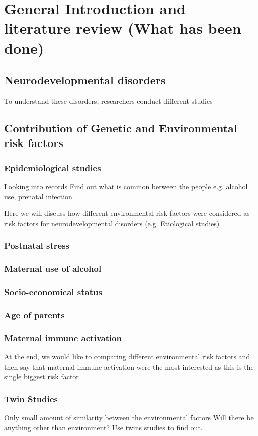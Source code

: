 \chapter{General Introduction and literature review (What has been done)}

\section{Neurodevelopmental disorders}

To understand these disorders, researchers conduct different studies
\section{Contribution of Genetic and Environmental risk factors}
\subsection{Epidemiological studies}
Looking into records
Find out what is common between the people
e.g. alcohol use, prenatal infection

Here we will discuss how different environmental risk factors were considered as risk factors for neurodevelopmental disorders (e.g. Etiological studies)
\subsection{Postnatal stress}
\subsection{Maternal use of alcohol}
\subsection{Socio-economical status}
\subsection{Age of parents}
\subsection{Maternal immune activation}
At the end, we would like to comparing different environmental risk factors and then say that maternal immune activation were the most interested as this is the single biggest risk factor

\subsection{Twin Studies}
Only small amount of similarity between the environmental factors
Will there be anything other than environment?
Use twins studies to find out.

